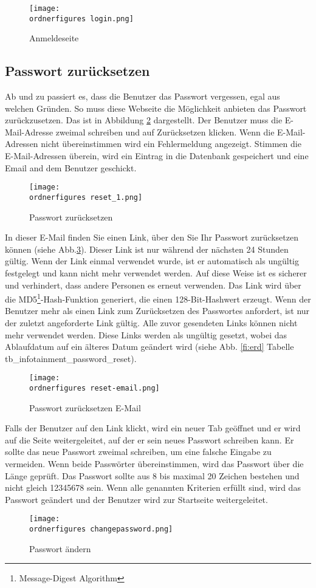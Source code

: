 \begin{figure}[H]
	\centering
	\texttt{[image: \\ordnerfigures login.png]}
	\caption{Anmeldeseite}
	\label{fi:login}
\end{figure}

\subsection{Passwort zurücksetzen}
Ab und zu passiert es, dass die Benutzer das Passwort vergessen, egal aus welchen Gründen. So muss diese Webseite die Möglichkeit anbieten das Passwort zurückzusetzen. Das ist in Abbildung \ref{fi:reset} dargestellt. Der Benutzer muss die E-Mail-Adresse zweimal schreiben und auf Zurücksetzen klicken. Wenn die E-Mail-Adressen nicht übereinstimmen wird ein Fehlermeldung angezeigt. Stimmen die E-Mail-Adressen überein, wird ein Eintrag in die Datenbank gespeichert und eine Email and dem Benutzer geschickt.
\begin{figure}[H]
	\centering
	\texttt{[image: \\ordnerfigures reset\_1.png]}
	\caption{Passwort zurücksetzen}
	\label{fi:reset}
\end{figure}

In dieser E-Mail finden Sie einen Link, über den Sie Ihr Passwort zurücksetzen können (siehe Abb.\ref{fi:resetemail}). Dieser Link ist nur während der nächsten 24 Stunden gültig. Wenn der Link einmal verwendet wurde, ist er automatisch als ungültig festgelegt und kann nicht mehr verwendet werden. Auf diese Weise ist es sicherer und verhindert, dass andere Personen es erneut verwenden. Das Link wird über die MD5\footnote{Message-Digest Algorithm }-Hash-Funktion generiert, die einen 128-Bit-Hashwert erzeugt. Wenn der Benutzer mehr als einen Link zum Zurücksetzen des Passwortes anfordert, ist nur der zuletzt angeforderte Link gültig. Alle zuvor gesendeten Links können nicht mehr verwendet werden. Diese Links werden als ungültig gesetzt, wobei das Ablaufdatum auf ein älteres Datum geändert wird (siehe Abb. \ref{fi:erd} Tabelle tb\_infotainment\_password\_reset). 

\begin{figure}[H]
	\centering
	\texttt{[image: \\ordnerfigures reset-email.png]}
	\caption{Passwort zurücksetzen E-Mail}
	\label{fi:resetemail}
\end{figure}

Falls der Benutzer auf den Link klickt, wird ein neuer Tab geöffnet und er wird auf die Seite weitergeleitet, auf der er sein neues Passwort schreiben kann. Er sollte das neue Passwort zweimal schreiben, um eine falsche Eingabe zu vermeiden. Wenn beide Passwörter übereinstimmen, wird das Passwort über die Länge geprüft. Das Passwort sollte aus 8 bis maximal 20 Zeichen bestehen und nicht gleich 12345678 sein.
Wenn alle genannten Kriterien erfüllt sind, wird das Passwort geändert und der Benutzer wird zur Startseite weitergeleitet.
\begin{figure}[H]
	\centering
	\texttt{[image: \\ordnerfigures changepassword.png]}
	\caption{Passwort ändern}
	\label{fi:reset-password}
\end{figure}

